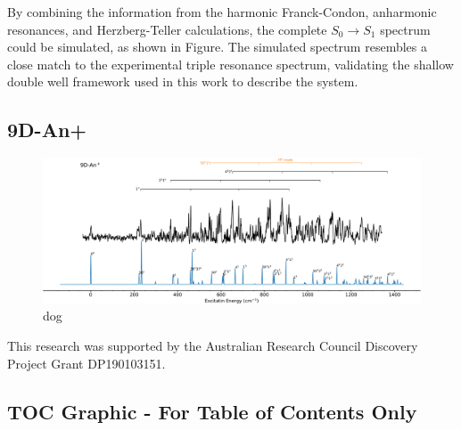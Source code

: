 \documentclass[journal=jpcafh,manuscript=article,layout=onecolumn, 12pt]{achemso}
\begin{document}
By combining the information from the harmonic Franck-Condon, anharmonic resonances, and Herzberg-Teller calculations, the complete $S_0\rightarrow S_1$ spectrum could be simulated, as shown in Figure. The simulated spectrum resembles a close match to the experimental triple resonance spectrum, validating the shallow double well framework used in this work to describe the system. 

\subsection{9D-An+}

\begin{figure} [h]
	\includegraphics[width=1\textwidth]{figures/9D-An+w}
	\caption{dog}
	\label{Fig:5}
\end{figure}

\begin{acknowledgement}
	This research was supported by the Australian Research Council Discovery
	Project Grant DP190103151.  
\end{acknowledgement}



\newpage
\onecolumn
\subsection{TOC Graphic - For Table of Contents Only}
\vspace{2ex}
\begin{center}
\end{center}
\end{document}
